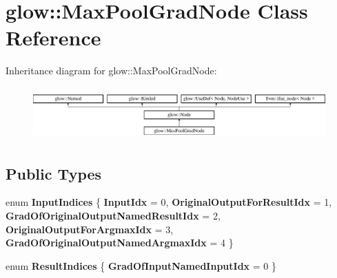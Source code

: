 \hypertarget{classglow_1_1_max_pool_grad_node}{}\section{glow\+:\+:Max\+Pool\+Grad\+Node Class Reference}
\label{classglow_1_1_max_pool_grad_node}
Inheritance diagram for glow\+:\+:Max\+Pool\+Grad\+Node\+:\begin{figure}[H]
\begin{center}
\leavevmode
\includegraphics[height=2.028986cm]{classglow_1_1_max_pool_grad_node}
\end{center}
\end{figure}
\subsection*{Public Types}
\begin{DoxyCompactItemize}
\item 
\mbox{\label{classglow_1_1_max_pool_grad_node_a36a600c6c7cfce2236a979b94c4df8bd}} 
enum {\bfseries Input\+Indices} \{ \newline
{\bfseries Input\+Idx} = 0, 
{\bfseries Original\+Output\+For\+Result\+Idx} = 1, 
{\bfseries Grad\+Of\+Original\+Output\+Named\+Result\+Idx} = 2, 
{\bfseries Original\+Output\+For\+Argmax\+Idx} = 3, 
\newline
{\bfseries Grad\+Of\+Original\+Output\+Named\+Argmax\+Idx} = 4
 \}
\item 
\mbox{\label{classglow_1_1_max_pool_grad_node_a63f322a55e470c4618b3f8ce72727e61}} 
enum {\bfseries Result\+Indices} \{ {\bfseries Grad\+Of\+Input\+Named\+Input\+Idx} = 0
 \}
\end{DoxyCompactItemize}
